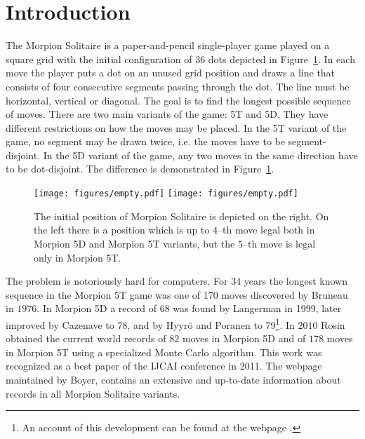 \section{Introduction}
The Morpion Solitaire is a paper-and-pencil single-player game played on a square grid with 
  the initial configuration of 36 dots depicted in Figure~\ref{fig:initial}. 
In each move the player puts a dot on an unused grid position and draws a line that 
  consists of four consecutive segments passing through the dot. 
The line must be horizontal, vertical or diagonal. 
The goal is to find the longest possible sequence of moves.
There are two main variants of the game: 5T and 5D. 
They have different restrictions on how the moves may be placed.
In the 5T variant of the game, no segment may be drawn twice, i.e. the moves have to be segment-disjoint. 
In the 5D variant of the game, any two moves in the same direction have to be dot-disjoint.
The difference is demonstrated in Figure~\ref{fig:initial}.

  \begin{figure}
    \centering
      \texttt{[image: figures/empty.pdf]}
      \texttt{[image: figures/empty.pdf]}
      \caption{\label{fig:initial}
	The initial position of Morpion Solitaire is depicted on the right. On the left there is a position which is up to $4$--th move legal 
both in Morpion 5D and Morpion 5T variants, but the $5$--th move is legal only in Morpion 5T. 
      }
\end{figure}

The problem is notoriously hard for computers. 
For $34$ years the longest known sequence in the Morpion 5T game
  was one of 170 moves discovered by Bruneau in $1976$. In Morpion 5D a record of 68 was found by Langerman in 1999, later improved by Cazenave \cite{tristan78} to 78, and by Hyyrö and Poranen \cite{finowie} to 79\footnote{An account of this development can be found at the webpage \cite{langerman}.}.
In $2010$ Rosin \cite{rosin} obtained the current world records of $82$ moves in Morpion 5D and of $178$ moves in Morpion 5T 
  using a specialized Monte Carlo algorithm. This work  was
   recognized as a best paper of the IJCAI conference in 2011. The webpage~\cite{boyer} maintained by Boyer, contains an extensive and up-to-date information about records in all Morpion Solitaire variants.

